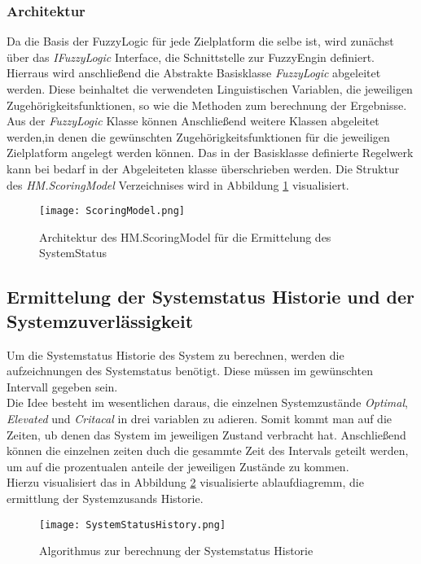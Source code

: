\subsubsection*{Architektur}
Da die Basis der FuzzyLogic für jede Zielplatform die selbe ist, wird zunächst über das \textit{IFuzzyLogic} Interface, die Schnittstelle zur FuzzyEngin definiert. Hierraus wird anschließend die Abstrakte Basisklasse \textit{FuzzyLogic} abgeleitet werden. Diese beinhaltet die verwendeten Linguistischen Variablen, die jeweiligen Zugehörigkeitsfunktionen, so wie die Methoden zum berechnung der Ergebnisse.\\
Aus der \textit{FuzzyLogic} Klasse können Anschließend weitere Klassen abgeleitet werden,in denen die gewünschten Zugehörigkeitsfunktionen für die jeweiligen Zielplatform angelegt werden können. Das in der Basisklasse definierte Regelwerk kann bei bedarf in der Abgeleiteten klasse überschrieben werden. Die Struktur des \textit{HM.ScoringModel} Verzeichnises wird in Abbildung \ref{fig:ScoringModel} visualisiert.  
\begin{center}
    \begin{figure}[h!]
        \centering
        \texttt{[image: ScoringModel.png]}
        \caption{Architektur des HM.ScoringModel für die Ermittelung des SystemStatus}
        \label{fig:ScoringModel}
    \end{figure}
\end{center}
\vspace{-0.5cm}

\subsection{Ermittelung der Systemstatus Historie und der Systemzuverlässigkeit}
Um die Systemstatus Historie des System zu berechnen, werden die aufzeichnungen des Systemstatus benötigt. Diese müssen im gewünschten Intervall gegeben sein.\\
Die Idee besteht im wesentlichen daraus, die einzelnen Systemzustände \textit{Optimal}, \textit{Elevated} und \textit{Critacal} in drei variablen zu adieren. Somit kommt man auf die Zeiten, ub denen das System im jeweiligen Zustand verbracht hat. Anschließend können die einzelnen zeiten duch die gesammte Zeit des Intervals geteilt werden, um auf die prozentualen anteile der jeweiligen Zustände zu kommen.\\
Hierzu visualisiert das in Abbildung \ref{fig:SystemStatusHistoryAlgorythmus} visualisierte ablaufdiagremm, die ermittlung der Systemzusands Historie.
\begin{center}
    \begin{figure}[h!]
        \centering
        \texttt{[image: SystemStatusHistory.png]}
        \caption{Algorithmus zur berechnung der Systemstatus Historie}
        \label{fig:SystemStatusHistoryAlgorythmus}
    \end{figure}
\end{center}




